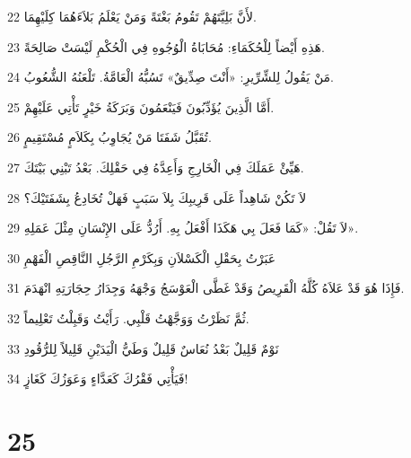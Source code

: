 \par 22 لأَنَّ بَلِيَّتَهُمْ تَقُومُ بَغْتَةً وَمَنْ يَعْلَمُ بَلاَءَهُمَا كِلَيْهِمَا.
\par 23 هَذِهِ أَيْضاً لِلْحُكَمَاءِ: مُحَابَاةُ الْوُجُوهِ فِي الْحُكْمِ لَيْسَتْ صَالِحَةً.
\par 24 مَنْ يَقُولُ لِلشِّرِّيرِ: «أَنْتَ صِدِّيقٌ» تَسُبُّهُ الْعَامَّةُ. تَلْعَنُهُ الشُّعُوبُ.
\par 25 أَمَّا الَّذِينَ يُؤَدِّبُونَ فَيَنْعَمُونَ وَبَرَكَةُ خَيْرٍ تَأْتِي عَلَيْهِمْ.
\par 26 تُقَبَّلُ شَفَتَا مَنْ يُجَاوِبُ بِكَلاَمٍ مُسْتَقِيمٍ.
\par 27 هَيِّئْ عَمَلَكَ فِي الْخَارِجِ وَأَعِدَّهُ فِي حَقْلِكَ. بَعْدُ تَبْنِي بَيْتَكَ.
\par 28 لاَ تَكُنْ شَاهِداً عَلَى قَرِيبِكَ بِلاَ سَبَبٍ فَهَلْ تُخَادِعُ بِشَفَتَيْكَ؟
\par 29 لاَ تَقُلْ: «كَمَا فَعَلَ بِي هَكَذَا أَفْعَلُ بِهِ. أَرُدُّ عَلَى الإِنْسَانِ مِثْلَ عَمَلِهِ».
\par 30 عَبَرْتُ بِحَقْلِ الْكَسْلاَنِ وَبِكَرْمِ الرَّجُلِ النَّاقِصِ الْفَهْمِ
\par 31 فَإِذَا هُوَ قَدْ عَلاَهُ كُلَّهُ الْقَرِيصُ وَقَدْ غَطَّى الْعَوْسَجُ وَجْهَهُ وَجِدَارُ حِجَارَتِهِ انْهَدَمَ.
\par 32 ثُمَّ نَظَرْتُ وَوَجَّهْتُ قَلْبِي. رَأَيْتُ وَقَبِلْتُ تَعْلِيماً.
\par 33 نَوْمٌ قَلِيلٌ بَعْدُ نُعَاسٌ قَلِيلٌ وَطَيُّ الْيَدَيْنِ قَلِيلاً لِلرُّقُودِ
\par 34 فَيَأْتِي فَقْرُكَ كَعَدَّاءٍ وَعَوَزُكَ كَغَازٍ!

\chapter{25}


